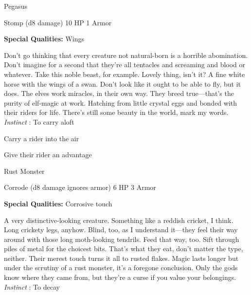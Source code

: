 \startMonsterName
Pegasus	 
\stopMonsterName
 

Stomp (d8 damage)	10 HP	1 Armor

 


 
\startMonsterQualities
{\bf Special Qualities:}  Wings
\stopMonsterQualities
 
\startMonsterDescription
Don’t go thinking that every creature not natural-born is a horrible abomination. Don’t imagine for a second that they’re all tentacles and screaming and blood or whatever. Take this noble beast, for example. Lovely thing, isn’t it? A fine white horse with the wings of a swan. Don’t look like it ought to be able to fly, but it does. The elves work miracles, in their own way. They breed true—that’s the purity of elf-magic at work. Hatching from little crystal eggs and bonded with their riders for life. There’s still some beauty in the world, mark my words. {\em Instinct} : To carry aloft
\stopMonsterDescription
 
\startitemize[1,packed]

\item Carry a rider into the air

 
\item Give their rider an advantage


\stopitemize
 
\startMonsterName
Rust Monster	 
\stopMonsterName
 

Corrode (d8 damage ignores armor)	6 HP	3 Armor

 


 
\startMonsterQualities
{\bf Special Qualities:}  Corrosive touch
\stopMonsterQualities
 
\startMonsterDescription
A very distinctive-looking creature. Something like a reddish cricket, I think. Long crickety legs, anyhow. Blind, too, as I understand it—they feel their way around with those long moth-looking tendrils. Feed that way, too. Sift through piles of metal for the choicest bits. That’s what they eat, don’t matter the type, neither. Their merest touch turns it all to rusted flakes. Magic lasts longer but under the scrutiny of a rust monster, it’s a foregone conclusion. Only the gods know where they came from, but they’re a curse if you value your belongings. {\em Instinct} : To decay
\stopMonsterDescription
 
\startitemize[1,packed]

